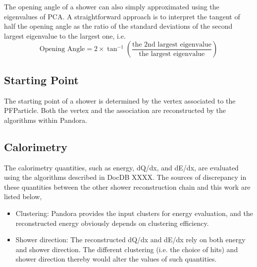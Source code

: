 The opening angle of a shower can also simply approximated using the
eigenvalues of PCA.
A straightforward approach is to interpret the tangent of half the 
opening angle as the ratio of the standard deviations of the second
largest eigenvalue to the largest one, i.e.
\begin{equation}
\label{eq:shropeningangle}
\textrm{Opening Angle} = 2\times \tan^{-1}({\frac{\textrm{the 2nd largest eigenvalue}}{\textrm{the largest eigenvalue}}})
\end{equation}

\subsection{Starting Point}
\label{sec:shrstartingpt}

The starting point of a shower is determined by the vertex associated to
the PFParticle.
Both the vertex and the association are reconstructed by the algorithms
within Pandora.

\subsection{Calorimetry}

The calorimetry quantities, such as energy, dQ/dx, and dE/dx, are
evaluated using the algorithms described in DocDB XXXX.
The sources of discrepancy in these quantities between the other
shower reconstruction chain and this work are listed below,
\begin{itemize}
\item Clustering: Pandora provides the input clusters for energy
      evaluation, and the reconstructed energy obviously depends
      on clustering efficiency.
\item Shower direction: The reconstructed dQ/dx and dE/dx rely on
      both energy and shower direction.  
      The different clustering (i.e. the  choice of hits) and 
      shower direction thereby would alter the values of such
      quantities.
\end{itemize}


